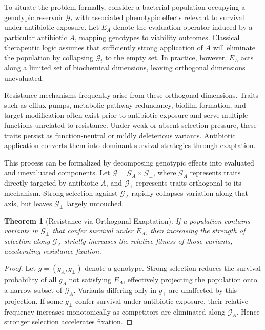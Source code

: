 \documentclass[11pt]{article}
\newtheorem{theorem}{Theorem}
\theoremstyle{definition}
\begin{document}
To situate the problem formally, consider a bacterial population occupying a genotypic reservoir $\mathcal{G}_t$ with associated phenotypic effects relevant to survival under antibiotic exposure. Let $E_A$ denote the evaluation operator induced by a particular antibiotic $A$, mapping genotypes to viability outcomes. Classical therapeutic logic assumes that sufficiently strong application of $A$ will eliminate the population by collapsing $\mathcal{G}_t$ to the empty set. In practice, however, $E_A$ acts along a limited set of biochemical dimensions, leaving orthogonal dimensions unevaluated.

Resistance mechanisms frequently arise from these orthogonal dimensions. Traits such as efflux pumps, metabolic pathway redundancy, biofilm formation, and target modification often exist prior to antibiotic exposure and serve multiple functions unrelated to resistance. Under weak or absent selection pressure, these traits persist as function-neutral or mildly deleterious variants. Antibiotic application converts them into dominant survival strategies through exaptation.

This process can be formalized by decomposing genotypic effects into evaluated and unevaluated components. Let $\mathcal{G} = \mathcal{G}_A \times \mathcal{G}_\perp$, where $\mathcal{G}_A$ represents traits directly targeted by antibiotic $A$, and $\mathcal{G}_\perp$ represents traits orthogonal to its mechanism. Strong selection against $\mathcal{G}_A$ rapidly collapses variation along that axis, but leaves $\mathcal{G}_\perp$ largely untouched.

\begin{theorem}[Resistance via Orthogonal Exaptation]
If a population contains variants in $\mathcal{G}_\perp$ that confer survival under $E_A$, then increasing the strength of selection along $\mathcal{G}_A$ strictly increases the relative fitness of those variants, accelerating resistance fixation.
\end{theorem}

\begin{proof}
Let $g = (g_A, g_\perp)$ denote a genotype. Strong selection reduces the survival probability of all $g_A$ not satisfying $E_A$, effectively projecting the population onto a narrow subset of $\mathcal{G}_A$. Variants differing only in $g_\perp$ are unaffected by this projection. If some $g_\perp$ confer survival under antibiotic exposure, their relative frequency increases monotonically as competitors are eliminated along $\mathcal{G}_A$. Hence stronger selection accelerates fixation.
\end{proof}
\end{document}
